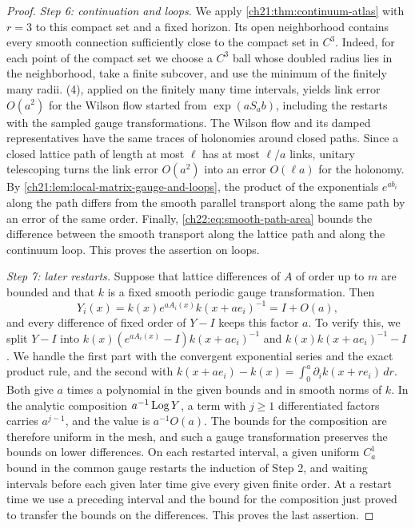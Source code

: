 \begin{proof}
\emph{Step 6: continuation and loops.} We apply \cref{ch21:thm:continuum-atlas} with $r=3$ to this compact set and a fixed horizon. Its open neighborhood contains every smooth connection sufficiently close to the compact set in $C^3$. Indeed, for each point of the compact set we choose a $C^3$ ball whose doubled radius lies in the neighborhood, take a finite subcover, and use the minimum of the finitely many radii. (4), applied on the finitely many time intervals, yields link error $O(a^2)$ for the Wilson flow started from $\exp(aS_ab)$, including the restarts with the sampled gauge transformations. The Wilson flow and its damped representatives have the same traces of holonomies around closed paths. Since a closed lattice path of length at most $\ell$ has at most $\ell/a$ links, unitary telescoping turns the link error $O(a^2)$ into an error $O(\ell a)$ for the holonomy. By \cref{ch21:lem:local-matrix-gauge-and-loops}, the product of the exponentials $e^{ab_i}$ along the path differs from the smooth parallel transport along the same path by an error of the same order. Finally, \eqref{ch22:eq:smooth-path-area} bounds the difference between the smooth transport along the lattice path and along the continuum loop. This proves the assertion on loops.

\emph{Step 7: later restarts.} Suppose that lattice differences of $A$ of order up to $m$ are bounded and that $k$ is a fixed smooth periodic gauge transformation. Then
\[
 Y_i(x)=k(x)e^{aA_i(x)}k(x+ae_i)^{-1}=I+O(a),
\]
and every difference of fixed order of $Y-I$ keeps this factor $a$. To verify this, we split $Y-I$ into $k(x)(e^{aA_i(x)}-I)k(x+ae_i)^{-1}$ and $k(x)k(x+ae_i)^{-1}-I$. We handle the first part with the convergent exponential series and the exact product rule, and the second with $k(x+ae_i)-k(x)=\int_0^a\partial_ik(x+re_i)\,dr$. Both give $a$ times a polynomial in the given bounds and in smooth norms of $k$. In the analytic composition $a^{-1}\operatorname{Log} Y$, a term with $j\ge1$ differentiated factors carries $a^{j-1}$, and the value is $a^{-1}O(a)$. The bounds for the composition are therefore uniform in the mesh, and such a gauge transformation preserves the bounds on lower differences. On each restarted interval, a given uniform $C^1_a$ bound in the common gauge restarts the induction of Step 2, and waiting intervals before each given later time give every given finite order. At a restart time we use a preceding interval and the bound for the composition just proved to transfer the bounds on the differences. This proves the last assertion.
\end{proof}

